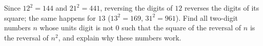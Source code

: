Since $12^2=144$ and $21^2=441$, reversing the digits of $12$ reverses the digits of its square; the same happens for $13$ ($13^2=169$, $31^2=961$). Find all two-digit numbers $n$ whose units digit is not $0$ such that the square of the reversal of $n$ is the reversal of $n^2$, and explain why these numbers work.
